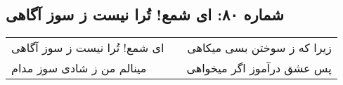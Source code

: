 \begin{center}
\section*{شماره ۸۰: ای شمع! تُرا نیست ز سوز آگاهی}
\label{sec:080}
\begin{longtable}{l p{0.5cm} r}
ای شمع! تُرا نیست ز سوز آگاهی
&&
زیرا که ز سوختن بسی میکاهی
\\
مینالم من ز شادی سوز مدام
&&
پس عشق درآموز اگر میخواهی
\\
\end{longtable}
\end{center}
